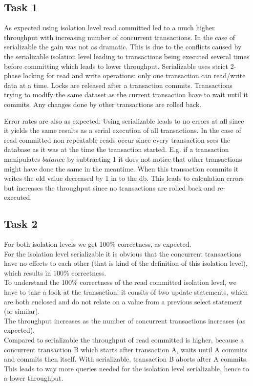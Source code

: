 \documentclass[11pt]{scrartcl}
\begin{document}
\subsection*{Task 1}
As expected using isolation level read committed led to a much higher throughput with increasing number of concurrent transactions. In the case of serializable the gain was not as dramatic. This is due to the conflicts caused by the serializable isolation level leading to transactions being executed several times before committing which leads to lower throughput.
Serializable uses strict 2-phase locking for read and write operations: only one transaction can read/write data at a time. Locks are released after a transaction commits. Transactions trying to modify the same dataset as the current transaction have to wait until it commits. Any changes done by other transactions are rolled back. 

Error rates are also as expected: Using serializable leads to no errors at all since it yields the same results as a serial execution of all transactions. In the case of read committed non repeatable reads occur since every transaction sees the database as it was at the time the transaction started. E.g. if a transaction manipulates $balance$ by subtracting 1 it does not notice that other transactions might have done the same in the meantime. When this transaction commits it writes the old value decreased by 1 in to the db. This leads to calculation errors but increases the throughput since no transactions are rolled back and re-executed.

\subsection*{Task 2}

For both isolation levels we get 100\% correctness, as expected.\\
For the isolation level serializable it is obvious that the concurrent transactions have no effects to each other (that is kind of the definition of this isolation level), which results in 100\% correctness.\\
To understand the 100\% correctness of the read committed isolation level, we have to take a look at the transaction: it consits of two update statements, which are both enclosed and do not relate on a value from a previous select statement (or similar).\\
The throughput increases as the number of concurrent transactions increases (as expected).\\
Compared to serializable the throughput of read committed is higher, because a concurrent transaction B which starts after transaction A, waits until A commits and commits then itself. With serializable, transaction B aborts after A commits. This leads to way more queries needed for the isolation level serializable, hence to a lower throughput.
\end{document}
